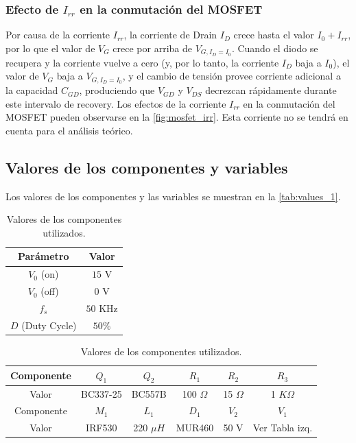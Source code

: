 \documentclass[e4_tp1_main.tex]{subfiles}
\begin{document}
\subsubsection{Efecto de $I_{rr}$ en la conmutación del MOSFET}
\label{subsubsec:irr_effect}
Por causa de la corriente $I_{rr}$, la corriente de Drain $I_D$ crece hasta el valor $I_0+I_{rr}$, por lo que el valor de $V_{G}$ crece por arriba de $V_{G,I_D=I_0}$. Cuando el diodo se recupera y la corriente vuelve a cero (y, por lo tanto, la corriente $I_D$ baja a $I_0$), el valor de $V_G$ baja a $V_{G,I_D=I_0}$, y el cambio de tensión provee corriente adicional a la capacidad $C_{GD}$, produciendo que $V_{GD}$ y $V_{DS}$ decrezcan rápidamente durante este intervalo de recovery. Los efectos de la corriente $I_{rr}$ en la conmutación del MOSFET pueden observarse en la \autoref{fig:mosfet_irr}. Esta corriente no se tendrá en cuenta para el análisis teórico.

\subsection{Valores de los componentes y variables}

Los valores de los componentes y las variables se muestran en la \autoref{tab:values_1}.

\begin{table}[H]
\centering
\begin{tabular}{|c|c|}
\hline
Parámetro & Valor \\
\hline
$V_0$ (on) & $15$ V \\
\hline
$V_0$ (off) & $0$ V \\
\hline
$f_s$ & $50$ KHz \\
\hline
$D$ (Duty Cycle) & $50\%$ \\
\hline
\end{tabular}
\begin{tabular}{|c|c|c|c|c|c|}
\hline
Componente & $Q_1$ & $Q_2$ & $R_1$ & $R_2$ & $R_3$ \\
\hline
Valor & BC337-25 & BC557B & 100 $\Omega$ & 15 $\Omega$ & 1 $K\Omega$ \\
\hline
Componente & $M_1$ & $L_1$ & $D_1$ & $V_2$ & $V_1$\\
\hline
Valor & IRF530 & 220 $\mu H$ & MUR460 & 50 V & Ver Tabla izq.\\
\hline
\end{tabular}
\caption{Valores de los componentes utilizados.}
\label{tab:values_1}
\end{table}
\end{document}

